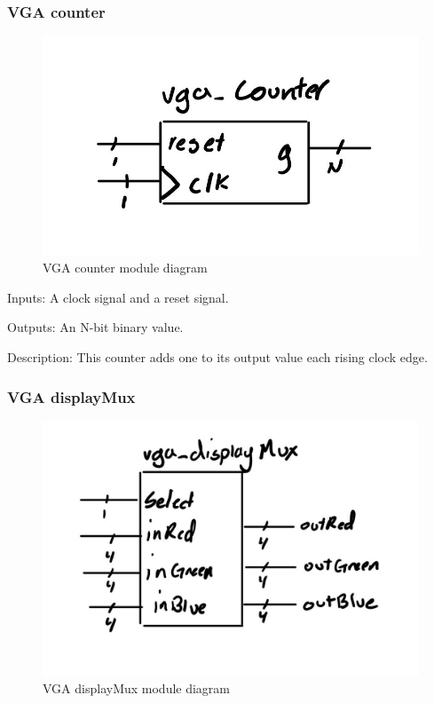 \documentclass[a4paper]{article}
\begin{document}
\subsubsection{VGA counter}

\begin{figure}[H]
    \includegraphics[width=0.8 \linewidth]{images/vgacounter.JPG}
    \caption{VGA counter module diagram}
    \label{vgaCounterDiagram}
\end{figure}

Inputs: A clock signal and a reset signal.

Outputs: An N-bit binary value.

Description: This counter adds one to its output value each rising clock edge.

\subsubsection{VGA displayMux}

\begin{figure}[H]
    \includegraphics[width=0.8 \linewidth]{images/vgadisplayMux.JPG}
    \caption{VGA displayMux module diagram}
    \label{vgaDisplayMuxDiagram}
\end{figure}
\end{document}
